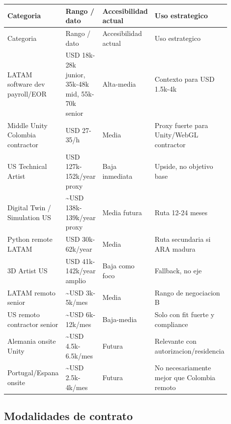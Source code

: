 \begin{center}
\scriptsize
\begin{longtable}{>{\raggedright\arraybackslash}p{0.225\linewidth} >{\raggedright\arraybackslash}p{0.225\linewidth} >{\raggedright\arraybackslash}p{0.225\linewidth} >{\raggedright\arraybackslash}p{0.225\linewidth}}
\toprule
Categoria & Rango / dato & Accesibilidad actual & Uso estrategico \\
\midrule
\endfirsthead
\toprule
Categoria & Rango / dato & Accesibilidad actual & Uso estrategico \\
\midrule
\endhead
LATAM software dev payroll/EOR & USD 18k-28k junior, 35k-48k mid, 55k-70k senior & Alta-media & Contexto para USD 1.5k-4k \\
Middle Unity Colombia contractor & USD 27-35/h & Media & Proxy fuerte para Unity/WebGL contractor \\
US Technical Artist & USD 127k-152k/year proxy & Baja inmediata & Upside, no objetivo base \\
Digital Twin / Simulation US & \textasciitilde{}USD 138k-139k/year proxy & Media futura & Ruta 12-24 meses \\
Python remote LATAM & USD 30k-62k/year & Media & Ruta secundaria si ARA madura \\
3D Artist US & USD 41k-142k/year amplio & Baja como foco & Fallback, no eje \\
LATAM remoto senior & \textasciitilde{}USD 3k-5k/mes & Media & Rango de negociacion B \\
US remoto contractor senior & \textasciitilde{}USD 6k-12k/mes & Baja-media & Solo con fit fuerte y compliance \\
Alemania onsite Unity & \textasciitilde{}USD 4.5k-6.5k/mes & Futura & Relevante con autorizacion/residencia \\
Portugal/Espana onsite & \textasciitilde{}USD 2.5k-4k/mes & Futura & No necesariamente mejor que Colombia remoto \\
\bottomrule
\end{longtable}
\end{center}


\subsection{Modalidades de contrato}


